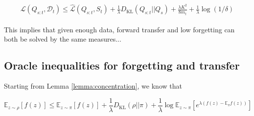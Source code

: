 \documentclass[letterpaper]{article}
\theoremstyle{definition}
\begin{document}
\begin{align}
\begin{split}
\mathcal{L}(Q_{s:t},\mathcal{D}_t) \leq \hat{\mathcal{L}}(Q_{s:t}, S_t) + \frac{1}{\lambda} D_{\mathrm{KL}}(Q_{s:t}||Q_{s})+\frac{\lambda K^2}{8m_t}+\frac{1}{\lambda}\log(1/\delta)
\end{split}
\end{align}

This implies that given enough data, forward transfer and low forgetting can both be solved by the same measures...





\subsection{Oracle inequalities for forgetting and transfer}

Starting from Lemma \ref{lemma:concentration}, we know that 

$$\mathbb{E}_{z\sim \rho}\left [f(z) \right ]\leq \mathbb{E}_{z\sim \pi}\left [f(z) \right ]+ \frac{1}{\lambda}D_{\mathrm{KL}}(\rho||\pi)+ \frac{1}{\lambda}\log\mathbb{E}_{z\sim \pi}\left [e^{\lambda(f(z)-\mathbb{E}_\pi f(z))} \right ]$$
\end{document}
